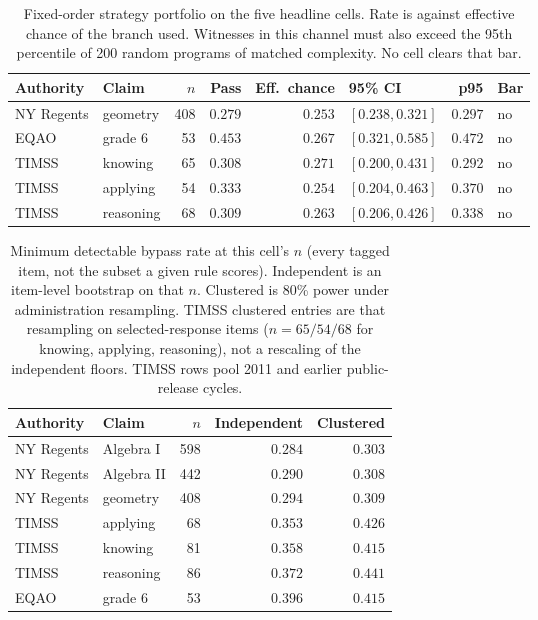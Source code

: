 \begin{table}[t]
  \caption{Fixed-order strategy portfolio on the five headline cells. Rate is against effective chance of the branch used. Witnesses in this channel must also exceed the 95th percentile of 200 random programs of matched complexity. No cell clears that bar.}
  \label{tab:portfolio}
  \centering
  \small
  \begin{tabular}{l l r r r l r l}
    \toprule
    Authority & Claim & $n$ & Pass & Eff.\ chance & 95\% CI & p95 & Bar \\
    \midrule
    NY Regents & geometry & 408 & $0.279$ & $0.253$ & $[0.238, 0.321]$ & $0.297$ & no \\
    EQAO & grade 6 & 53 & $0.453$ & $0.267$ & $[0.321, 0.585]$ & $0.472$ & no \\
    TIMSS & knowing & 65 & $0.308$ & $0.271$ & $[0.200, 0.431]$ & $0.292$ & no \\
    TIMSS & applying & 54 & $0.333$ & $0.254$ & $[0.204, 0.463]$ & $0.370$ & no \\
    TIMSS & reasoning & 68 & $0.309$ & $0.263$ & $[0.206, 0.426]$ & $0.338$ & no \\
    \bottomrule
  \end{tabular}
\end{table}

\begin{table}[t]
  \caption{Minimum detectable bypass rate at this cell's $n$ (every tagged item, not the subset a given rule scores). Independent is an item-level bootstrap on that $n$. Clustered is 80\% power under administration resampling. TIMSS clustered entries are that resampling on selected-response items ($n=65/54/68$ for knowing, applying, reasoning), not a rescaling of the independent floors. TIMSS rows pool 2011 and earlier public-release cycles.}
  \label{tab:power}
  \centering
  \small
  \begin{tabular}{l l r r r}
    \toprule
    Authority & Claim & $n$ & Independent & Clustered \\
    \midrule
    NY Regents & Algebra I & 598 & $0.284$ & $0.303$ \\
    NY Regents & Algebra II & 442 & $0.290$ & $0.308$ \\
    NY Regents & geometry & 408 & $0.294$ & $0.309$ \\
    TIMSS & applying & 68 & $0.353$ & $0.426$ \\
    TIMSS & knowing & 81 & $0.358$ & $0.415$ \\
    TIMSS & reasoning & 86 & $0.372$ & $0.441$ \\
    EQAO & grade 6 & 53 & $0.396$ & $0.415$ \\
    \bottomrule
  \end{tabular}
\end{table}


